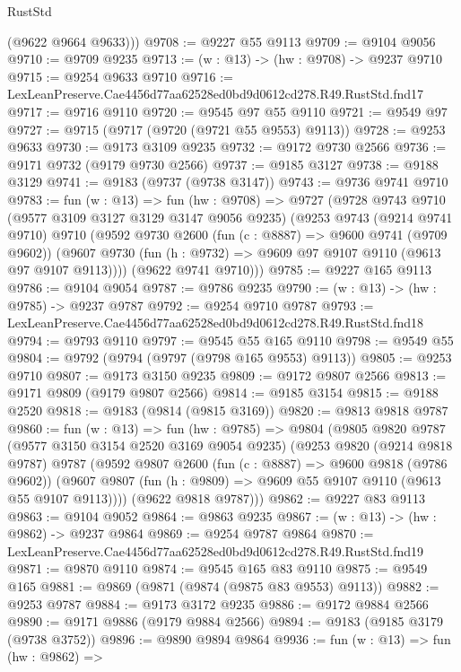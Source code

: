 \begin{lexlean}{RustStd}
\begin{coremodule}
        (@9622 @9664 @9633)))
@9708 := @9227 @55 @9113
@9709 := @9104 @9056
@9710 := @9709 @9235
@9713 := (w : @13) -> (hw : @9708) -> @9237 @9710
@9715 := @9254 @9633 @9710
@9716 := LexLeanPreserve.Cae4456d77aa62528ed0bd9d0612cd278.R49.RustStd.fnd17
@9717 := @9716 @9110
@9720 := @9545 @97 @55 @9110
@9721 := @9549 @97
@9727 := @9715 (@9717 (@9720 (@9721 @55 @9553) @9113))
@9728 := @9253 @9633
@9730 := @9173 @3109 @9235
@9732 := @9172 @9730 @2566
@9736 := @9171 @9732 (@9179 @9730 @2566)
@9737 := @9185 @3127
@9738 := @9188 @3129
@9741 := @9183 (@9737 (@9738 @3147))
@9743 := @9736 @9741 @9710
@9783 := fun (w : @13) =>
  fun (hw : @9708) =>
  @9727
    (@9728
      @9743
      @9710
      (@9577 @3109 @3127 @3129 @3147 @9056 @9235)
      (@9253
        @9743
        (@9214 @9741 @9710)
        @9710
        (@9592
          @9730
          @2600
          (fun (c : @8887) => @9600 @9741 (@9709 @9602))
          (@9607 @9730 (fun (h : @9732) => @9609 @97 @9107 @9110 (@9613 @97 @9107 @9113))))
        (@9622 @9741 @9710)))
@9785 := @9227 @165 @9113
@9786 := @9104 @9054
@9787 := @9786 @9235
@9790 := (w : @13) -> (hw : @9785) -> @9237 @9787
@9792 := @9254 @9710 @9787
@9793 := LexLeanPreserve.Cae4456d77aa62528ed0bd9d0612cd278.R49.RustStd.fnd18
@9794 := @9793 @9110
@9797 := @9545 @55 @165 @9110
@9798 := @9549 @55
@9804 := @9792 (@9794 (@9797 (@9798 @165 @9553) @9113))
@9805 := @9253 @9710
@9807 := @9173 @3150 @9235
@9809 := @9172 @9807 @2566
@9813 := @9171 @9809 (@9179 @9807 @2566)
@9814 := @9185 @3154
@9815 := @9188 @2520
@9818 := @9183 (@9814 (@9815 @3169))
@9820 := @9813 @9818 @9787
@9860 := fun (w : @13) =>
  fun (hw : @9785) =>
  @9804
    (@9805
      @9820
      @9787
      (@9577 @3150 @3154 @2520 @3169 @9054 @9235)
      (@9253
        @9820
        (@9214 @9818 @9787)
        @9787
        (@9592
          @9807
          @2600
          (fun (c : @8887) => @9600 @9818 (@9786 @9602))
          (@9607 @9807 (fun (h : @9809) => @9609 @55 @9107 @9110 (@9613 @55 @9107 @9113))))
        (@9622 @9818 @9787)))
@9862 := @9227 @83 @9113
@9863 := @9104 @9052
@9864 := @9863 @9235
@9867 := (w : @13) -> (hw : @9862) -> @9237 @9864
@9869 := @9254 @9787 @9864
@9870 := LexLeanPreserve.Cae4456d77aa62528ed0bd9d0612cd278.R49.RustStd.fnd19
@9871 := @9870 @9110
@9874 := @9545 @165 @83 @9110
@9875 := @9549 @165
@9881 := @9869 (@9871 (@9874 (@9875 @83 @9553) @9113))
@9882 := @9253 @9787
@9884 := @9173 @3172 @9235
@9886 := @9172 @9884 @2566
@9890 := @9171 @9886 (@9179 @9884 @2566)
@9894 := @9183 (@9185 @3179 (@9738 @3752))
@9896 := @9890 @9894 @9864
@9936 := fun (w : @13) =>
  fun (hw : @9862) =>

\end{coremodule}
\end{lexlean}
